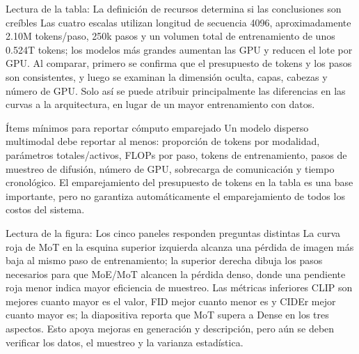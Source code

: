 
\begin{knowledgebox}{Lectura de la tabla: La definición de recursos determina si las conclusiones son creíbles}
Las cuatro escalas utilizan longitud de secuencia 4096, aproximadamente 2.10M tokens/paso, 250k pasos y un volumen total de entrenamiento de unos 0.524T tokens; los modelos más grandes aumentan las GPU y reducen el lote por GPU. Al comparar, primero se confirma que el presupuesto de tokens y los pasos son consistentes, y luego se examinan la dimensión oculta, capas, cabezas y número de GPU. Solo así se puede atribuir principalmente las diferencias en las curvas a la arquitectura, en lugar de un mayor entrenamiento con datos.
\end{knowledgebox}

\begin{importantbox}{Ítems mínimos para reportar cómputo emparejado}
Un modelo disperso multimodal debe reportar al menos: proporción de tokens por modalidad, parámetros totales/activos, FLOPs por paso, tokens de entrenamiento, pasos de muestreo de difusión, número de GPU, sobrecarga de comunicación y tiempo cronológico. El emparejamiento del presupuesto de tokens en la tabla es una base importante, pero no garantiza automáticamente el emparejamiento de todos los costos del sistema.
\end{importantbox}


\begin{knowledgebox}{Lectura de la figura: Los cinco paneles responden preguntas distintas}
La curva roja de MoT en la esquina superior izquierda alcanza una pérdida de imagen más baja al mismo paso de entrenamiento; la superior derecha dibuja los pasos necesarios para que MoE/MoT alcancen la pérdida denso, donde una pendiente roja menor indica mayor eficiencia de muestreo. Las métricas inferiores CLIP son mejores cuanto mayor es el valor, FID mejor cuanto menor es y CIDEr mejor cuanto mayor es; la diapositiva reporta que MoT supera a Dense en los tres aspectos. Esto apoya mejoras en generación y descripción, pero aún se deben verificar los datos, el muestreo y la varianza estadística.
\end{knowledgebox}

